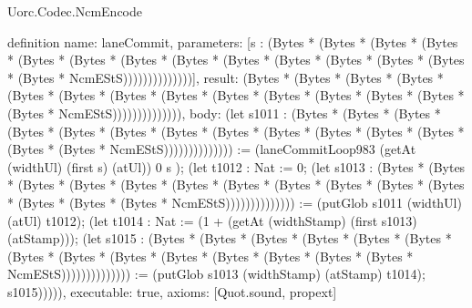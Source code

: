 \begin{lexlean}{Uorc.Codec.NcmEncode}
\begin{semanticmodule}
definition{
  name: laneCommit,
  parameters: [s : (Bytes * (Bytes * (Bytes * (Bytes * (Bytes * (Bytes * (Bytes * (Bytes * (Bytes * (Bytes * (Bytes * (Bytes * (Bytes * (Bytes * NcmEStS))))))))))))))],
  result: (Bytes * (Bytes * (Bytes * (Bytes * (Bytes * (Bytes * (Bytes * (Bytes * (Bytes * (Bytes * (Bytes * (Bytes * (Bytes * (Bytes * NcmEStS)))))))))))))),
  body: (let s1011 : (Bytes * (Bytes * (Bytes * (Bytes * (Bytes * (Bytes * (Bytes * (Bytes * (Bytes * (Bytes * (Bytes * (Bytes * (Bytes * (Bytes * NcmEStS)))))))))))))) := (laneCommitLoop983 (getAt (widthUl) (first s) (atUl)) 0 s ); (let t1012 : Nat := 0; (let s1013 : (Bytes * (Bytes * (Bytes * (Bytes * (Bytes * (Bytes * (Bytes * (Bytes * (Bytes * (Bytes * (Bytes * (Bytes * (Bytes * (Bytes * NcmEStS)))))))))))))) := (putGlob s1011 (widthUl) (atUl) t1012); (let t1014 : Nat := (1 + (getAt (widthStamp) (first s1013) (atStamp))); (let s1015 : (Bytes * (Bytes * (Bytes * (Bytes * (Bytes * (Bytes * (Bytes * (Bytes * (Bytes * (Bytes * (Bytes * (Bytes * (Bytes * (Bytes * NcmEStS)))))))))))))) := (putGlob s1013 (widthStamp) (atStamp) t1014); s1015))))),
  executable: true,
  axioms: [Quot.sound, propext]
}


\end{semanticmodule}
\end{lexlean}
